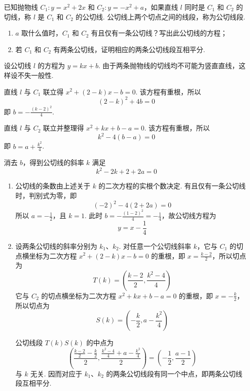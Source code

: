 \begin{problem}
已知抛物线 \(C_{1}: y = x^{2} + 2x\) 和 \(C_{2}: y = -x^{2} + a\)，如果直线 \(l\) 同时是 \(C_{1}\) 和 \(C_{2}\) 的切线，称 \(l\) 是 \(C_{1}\) 和 \(C_{2}\) 的公切线. 公切线上两个切点之间的线段，称为公切线段.

\begin{enumerate}
\item \(a\) 取什么值时，\(C_1\) 和 \(C_2\) 有且仅有一条公切线？写出此公切线的方程；
\item 若 \(C_1\) 和 \(C_2\) 有两条公切线，证明相应的两条公切线段互相平分.
\end{enumerate}

\begin{solution}
设公切线 \(l\) 的方程为 \(y=kx+b\). 由于两条抛物线的切线均不可能为竖直直线，这样设不失一般性.

直线 \(l\) 与 \(C_{1}\) 联立得 \(x^{2}+(2-k)x-b=0\). 该方程有重根，所以
\[
(2-k)^{2}+4b=0
\]
即 \(b=-\frac{(k-2)^{2}}{4}\).

直线 \(l\) 与 \(C_{2}\) 联立并整理得 \(x^{2}+kx+b-a=0\). 该方程有重根，所以
\[
k^{2}-4(b-a)=0
\]
即 \(b=a+\frac{k^{2}}{4}\).

消去 \(b\)，得到公切线的斜率 \(k\) 满足
\[
k^{2}-2k+2+2a=0
\]

\begin{enumerate}
\item 公切线的条数由上述关于 \(k\) 的二次方程的实根个数决定. 有且仅有一条公切线时，判别式为零，即
\[
(-2)^{2}-4(2+2a)=0
\]
所以 \(a=-\frac{1}{2}\)，且 \(k=1\). 此时 \(b=-\frac{(1-2)^{2}}{4}=-\frac{1}{4}\)，故公切线方程为
\[
y=x-\frac{1}{4}
\]

\item 设两条公切线的斜率分别为 \(k_{1}\)、\(k_{2}\). 对任意一个公切线斜率 \(k\)，它与 \(C_{1}\) 的切点横坐标为二次方程 \(x^{2}+(2-k)x-b=0\) 的重根，即 \(x=\frac{k-2}{2}\)，所以切点为
\[
T(k)=\left(\frac{k-2}{2},\frac{k^{2}-4}{4}\right)
\]
它与 \(C_{2}\) 的切点横坐标为二次方程 \(x^{2}+kx+b-a=0\) 的重根，即 \(x=-\frac{k}{2}\)，所以切点为
\[
S(k)=\left(-\frac{k}{2},a-\frac{k^{2}}{4}\right)
\]

公切线段 \(T(k)S(k)\) 的中点为
\[
\left(\frac{\frac{k-2}{2}-\frac{k}{2}}{2},\frac{\frac{k^{2}-4}{4}+a-\frac{k^{2}}{4}}{2}\right)=\left(-\frac{1}{2},\frac{a-1}{2}\right)
\]
与 \(k\) 无关. 因而对应于 \(k_{1}\)、\(k_{2}\) 的两条公切线段有同一个中点，即两条公切线段互相平分.
\end{enumerate}
\end{solution}
\end{problem}

